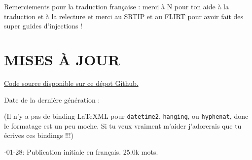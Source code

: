 \documentclass{article}
\begin{document}
Remerciements pour la traduction française : merci à N pour ton aide à la traduction et à la relecture et merci au SRTIP et au FLIRT pour avoir fait des super guides d'injections !

\section*{MISES À JOUR}

\noindent \href{https://github.com/Juicysteak117/pghrt/}{Code source disponible sur ce dépot Github.}

\noindent Date de la dernière génération : \DTMnow

\noindent(Il n'y a pas de binding LaTeXML pour \texttt{datetime2}, \texttt{hanging}, ou \texttt{hyphenat}, donc le formatage est un peu moche. Si tu veux vraiment m'aider j'adorerais que tu écrives ces bindings !!!)

-01-28: Publication initiale en français. 25.0k mots.
\end{document}
